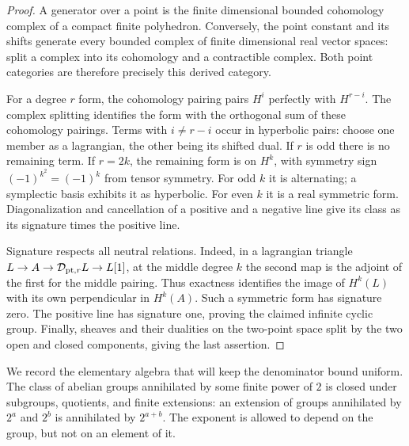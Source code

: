 \begin{proof}
A generator over a point is the finite dimensional bounded cohomology
complex of a compact finite polyhedron.  Conversely, the point constant
and its shifts generate every bounded complex of finite dimensional
real vector spaces: split a complex into its cohomology and a
contractible complex.  Both point categories are therefore precisely
this derived category.

For a degree $r$ form, the cohomology pairing pairs $H^i$ perfectly with
$H^{r-i}$.  The complex splitting identifies the form with the
orthogonal sum of these cohomology pairings.  Terms with $i\ne r-i$
occur in hyperbolic pairs: choose one member as a lagrangian, the other
being its shifted dual.  If $r$ is odd there is no remaining term.
If $r=2k$, the remaining form is on $H^k$, with symmetry sign
$(-1)^{k^2}=(-1)^k$ from tensor symmetry.  For odd $k$ it is alternating;
a symplectic basis exhibits it as hyperbolic.  For even $k$ it is a
real symmetric form.  Diagonalization and cancellation of a positive
and a negative line give its class as its signature times the
positive line.

Signature respects all neutral relations.  Indeed, in a lagrangian
triangle $L\to A\to\mathcal D_{\mathrm{pt},r}L\to L[1]$, at the middle degree $k$ the
second map is the adjoint of the first for the middle pairing.  Thus
exactness identifies the image of $H^k(L)$ with its own perpendicular
in $H^k(A)$.  Such a symmetric form has signature zero.  The positive
line has signature one, proving the claimed infinite cyclic group.
Finally, sheaves and their dualities on the two-point space split by
the two open and closed components, giving the last assertion.
\end{proof}

We record the elementary algebra that will keep the denominator bound
uniform.  The class of abelian groups annihilated by some finite power
of $2$ is closed under subgroups, quotients, and finite extensions:
an extension of groups annihilated by $2^a$ and $2^b$ is annihilated by
$2^{a+b}$.  The exponent is allowed to depend on the group, but not on
an element of it.

